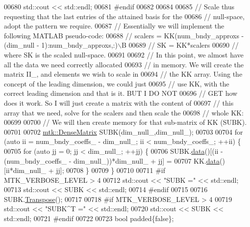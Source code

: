 \begin{DoxyCode}
{{00680   std::cout << std::endl;
00681 \textcolor{preprocessor}{  #endif}
00682 
00684 
00685   \textcolor{comment}{// Scale thus requesting that the last entries of the attained basis for the}
00686   \textcolor{comment}{// null-space, adopt the pattern we require.}
00687   \textcolor{comment}{// Essentially we will implement the following MATLAB pseudo-code:}
00688   \textcolor{comment}{//  scalers = KK(num\_bndy\_approxs - (dim\_null - 1):num\_bndy\_approxs,:)\(\backslash\)B}
00689   \textcolor{comment}{//  SK = KK*scalers}
00690   \textcolor{comment}{// where SK is the scaled null-space.}
00691 
00692   \textcolor{comment}{// In this point, we almost have all the data we need correctly allocated}
00693   \textcolor{comment}{// in memory. We will create the matrix II\_, and elements we wish to scale in}
00694   \textcolor{comment}{// the KK array. Using the concept of the leading dimension, we could just}
00695   \textcolor{comment}{// use KK, with the correct leading dimension and that is it. BUT I DO NOT}
00696   \textcolor{comment}{// GET how does it work. So I will just create a matrix with the content of}
00697   \textcolor{comment}{// this array that we need, solve for the scalers and then scale the}
00698   \textcolor{comment}{// whole KK:}
00699 
00700   \textcolor{comment}{// We will then create memory for that sub-matrix of KK (SUBK).}
00701 
00702   \hyperlink{classmtk_1_1DenseMatrix}{mtk::DenseMatrix} SUBK(dim\_null\_,dim\_null\_);
00703 
00704   \textcolor{keywordflow}{for} (\textcolor{keyword}{auto} ii = num\_bndy\_coeffs\_ - dim\_null\_; ii < num\_bndy\_coeffs\_; ++ii) \{
00705     \textcolor{keywordflow}{for} (\textcolor{keyword}{auto} jj = 0; jj < dim\_null\_; ++jj) \{
00706       SUBK.\hyperlink{classmtk_1_1DenseMatrix_a0c33b8a9e01d157c61ddbdf807c25d84}{data}()[(ii - (num\_bndy\_coeffs\_ - dim\_null\_))*dim\_null\_ + jj] =
00707           KK.\hyperlink{classmtk_1_1DenseMatrix_a0c33b8a9e01d157c61ddbdf807c25d84}{data}()[ii*dim\_null\_ + jj];
00708     \}
00709   \}
00710 
00711 \textcolor{preprocessor}{  #if MTK\_VERBOSE\_LEVEL > 4}
00712   std::cout << \textcolor{stringliteral}{"SUBK ="} << std::endl;
00713   std::cout << SUBK << std::endl;
00714 \textcolor{preprocessor}{  #endif}
00715 
00716   SUBK.\hyperlink{classmtk_1_1DenseMatrix_a71d9c07ca66e88d97d1fd5012f43138b}{Transpose}();
00717 
00718 \textcolor{preprocessor}{  #if MTK\_VERBOSE\_LEVEL > 4}
00719   std::cout << \textcolor{stringliteral}{"SUBK^T ="} << std::endl;
00720   std::cout << SUBK << std::endl;
00721 \textcolor{preprocessor}{  #endif}
00722 
00723   \textcolor{keywordtype}{bool} padded\{\textcolor{keyword}{false}\};
}}
\end{DoxyCode}
